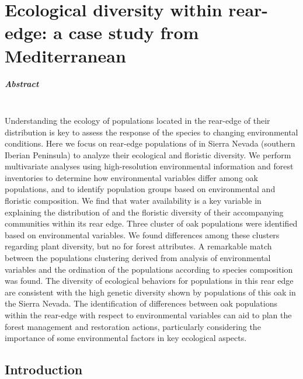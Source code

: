%
\chapter{Ecological diversity within rear-edge: a case study from Mediterranean \Qpw}\label{sec:multivar}

\newpage

\paragraph{Abstract} \mbox{} \\
Understanding the ecology of populations located in the rear-edge of their distribution is key to assess the response of the species to changing environmental conditions. Here we focus on rear-edge populations of \Qpy in Sierra Nevada (southern Iberian Peninsula) to analyze their ecological and floristic diversity. We perform multivariate analyses using high-resolution environmental information and forest inventories to determine how environmental variables differ among oak populations, and to identify population groups based on environmental and floristic composition.
We find that water availability is a key variable in explaining the distribution of \Qp and the floristic diversity of their accompanying communities within its rear edge. Three cluster of oak populations were identified based on environmental variables. We found differences among these clusters regarding plant diversity, but no for forest attributes. A remarkable match between the populations clustering derived from analysis of environmental variables and the ordination of the populations according to species composition was found.
The diversity of ecological behaviors for \Qp populations in this rear edge are consistent with the high genetic diversity shown by populations of this oak in the Sierra Nevada. The identification of differences between oak populations within the rear-edge with respect to environmental variables can aid to plan the forest management and restoration actions, particularly considering the importance of some environmental factors in key ecological aspects.
\newpage

\section{Introduction}\label{sec:multivar:intro}

